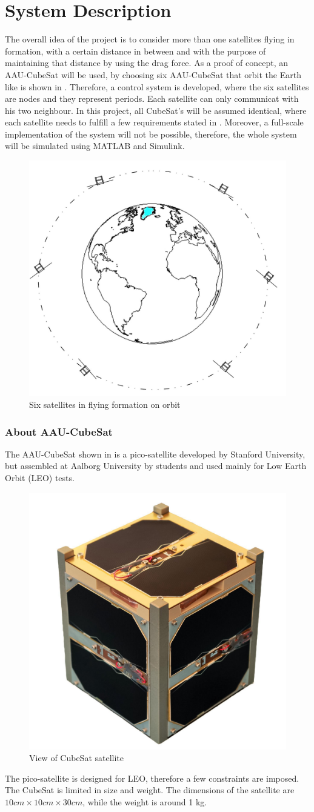 \chapter{System Description}\label{chap:systemDescribtion}
The overall idea of the project is to consider more than one satellites flying in formation, with a certain distance in between and with the purpose of maintaining that distance by using the drag force. As a proof of concept, an AAU-CubeSat will be used, by choosing six AAU-CubeSat that orbit the Earth like is shown in  . Therefore, a control system is developed, where the six satellites are nodes and they represent periods. Each satellite can only communicat with his two neighbour. In this project, all CubeSat's will be assumed identical, where each satellite needs to fulfill a few requirements stated in . Moreover, a full-scale implementation of the system will not be possible, therefore, the whole system will be simulated using MATLAB and Simulink. 
%
\begin{figure}[H]
	\centering
	\includegraphics[width=0.6\linewidth]{figures/earth}
	\caption{Six satellites in flying formation on orbit}
	\label{fig:1}
\end{figure}
%
\subsection{About AAU-CubeSat}
The AAU-CubeSat shown in  is a pico-satellite developed by Stanford University, but assembled at Aalborg University by students and used mainly for Low Earth Orbit (LEO)  tests.
\begin{figure}[H]
	\centering
	\includegraphics[width=0.3\linewidth]{figures/aau_cubsat}
	\caption{View of CubeSat satellite}
	\label{fig:pico}
\end{figure}
The pico-satellite is designed for LEO, therefore a few constraints are imposed. The CubeSat is limited in size and weight. The dimensions of the satellite are $10cm\times10cm\times30cm$, while the weight is around 1 kg. 

